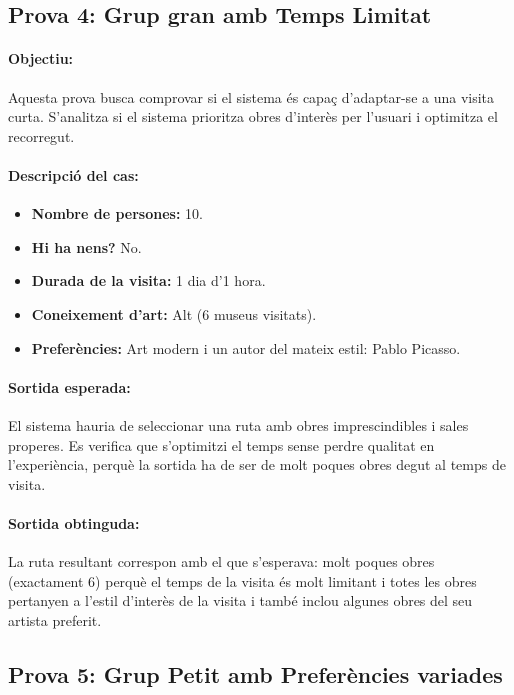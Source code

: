 \documentclass[a4paper]{article}
\begin{document}
	\subsection{Prova 4: Grup gran amb Temps Limitat}
	
	\paragraph{Objectiu:} 
	Aquesta prova busca comprovar si el sistema és capaç d’adaptar-se a una visita curta. S’analitza si el sistema prioritza obres d'interès per l'usuari i optimitza el recorregut.
	
	\paragraph{Descripció del cas:} 
	
	\begin{itemize}
		\item \textbf{Nombre de persones:} 10.
		\item \textbf{Hi ha nens?} No.
		\item \textbf{Durada de la visita:} 1 dia d’1 hora.
		\item \textbf{Coneixement d’art:} Alt (6 museus visitats).
		\item \textbf{Preferències:} Art modern i un autor del mateix estil: Pablo Picasso.
	\end{itemize}
	
	\paragraph{Sortida esperada:}
	El sistema hauria de seleccionar una ruta amb obres imprescindibles i sales properes. Es verifica que s’optimitzi el temps sense perdre qualitat en l’experiència, perquè la sortida ha de ser de molt poques obres degut al temps de visita.
	
	\paragraph{Sortida obtinguda:}
	La ruta resultant correspon amb el que s'esperava: molt poques obres (exactament 6) perquè el temps de la visita és molt limitant i totes les obres pertanyen a l'estil d'interès de la visita i també inclou algunes obres del seu artista preferit.
	
	\subsection{Prova 5: Grup Petit amb Preferències variades}
	
\end{document}
